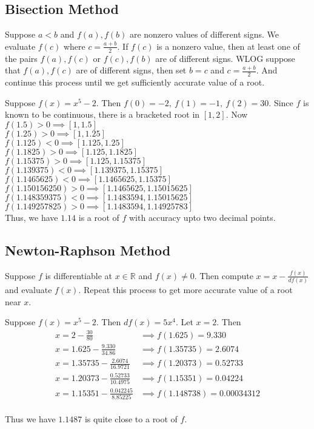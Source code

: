 \subsection{Bisection Method}
	Suppose $a < b$ and $f(a),f(b)$ are nonzero values of different signs. We evaluate $f(c)$ where $c = \frac{a+b}{2}$. If $f(c)$ is a nonzero value, then at least one of the pairs $f(a),f(c)$ or $f(c),f(b)$ are of different signs. WLOG suppose that $f(a),f(c)$ are of different signs, then set $b = c$ and $c = \frac{a+b}{2}$. And continue this process until we get sufficiently accurate value of a root.

\begin{remark}
	Suppose $f(x) = x^5 - 2$. Then $f(0) = -2,\ f(1) = -1,\ f(2) = 30$. Since $f$ is known to be continuous, there is a bracketed root in $[1,2]$. Now $f(1.5) > 0 \implies [1,1.5]$\\
	$f(1.25) > 0 \implies [1,1.25]$\\
	$f(1.125) < 0 \implies [1.125,1.25]$\\
	$f(1.1825)>0 \implies [1.125,1.1825]$\\
	$f(1.15375)>0 \implies [1.125,1.15375]$\\
	$f(1.139375) < 0 \implies [1.139375,1.15375]$\\
	$f(1.1465625) < 0 \implies [1.1465625,1.15375]$\\
	$f(1.150156250) > 0 \implies [1.1465625,1.15015625]$\\
	$f(1.148359375) < 0 \implies [1.1483594,1.15015625]$\\
	$f(1.149257825) > 0 \implies [1.1483594,1.14925783]$\\
	
	Thus, we have $1.14$ is a root of $f$ with accuracy upto two decimal points.
\end{remark}

\subsection{Newton-Raphson Method}
	Suppose $f$ is differentiable at $x \in \mathbb{R}$ and $f(x) \ne 0$. Then compute $x = x - \frac{f(x)}{df(x)}$ and evaluate $f(x)$. Repeat this process to get more accurate value of a root near $x$.

\begin{remark}
	Suppose $f(x) = x^5 - 2$. Then $df(x) = 5x^4$. Let $x = 2$. Then\\
	\begin{align*}
		x = 2 - \frac{30}{80} & \implies f(1.625) = 9.330 \\
		x = 1.625 - \frac{9.330}{34.86} & \implies f(1.35735) = 2.6074 \\
		x = 1.35735 - \frac{2.6074}{16.9721} & \implies f(1.20373) = 0.52733 \\
		x = 1.20373 - \frac{0.52733}{10.4975} & \implies f(1.15351) = 0.04224 \\
		x = 1.15351 - \frac{0.042245}{8.85225} & \implies f(1.148738) = 0.00034312 \\
	\end{align*}

	Thus we have $1.1487$ is quite close to a root of $f$.
\end{remark}

